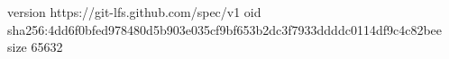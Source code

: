 version https://git-lfs.github.com/spec/v1
oid sha256:4dd6f0bfed978480d5b903e035cf9bf653b2dc3f7933ddddc0114df9c4c82bee
size 65632
